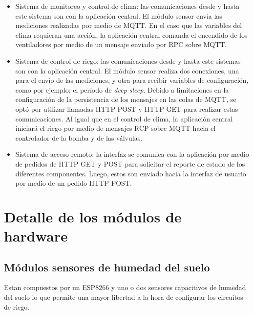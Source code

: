  \begin{itemize}
	\item Sistema de monitoreo y control de clima: las comunicaciones desde y hasta este sistema son con la aplicación central.
	El módulo sensor envía las mediciones realizadas por medio de MQTT.
	En el caso que las variables del clima requieran una acción, la aplicación central comanda el encendido de los ventiladores por medio de un mensaje enviado por RPC sobre MQTT.
	
	\item Sistema de control de riego: las comunicaciones desde y hasta este sistemas son con la aplicación central.
	El módulo sensor realiza dos conexiones, una para el envío de las mediciones, y otra para recibir variables de configuración, como por ejemplo: el período de \textit{deep sleep}. Debido a limitaciones en la configuración de la persistencia de los mensajes en las colas de MQTT, se optó por utilizar llamadas HTTP POST y HTTP GET para realizar estas comunicaciones.
	Al igual que en el control de clima, la aplicación central iniciará el riego por medio de mensajes RCP sobre MQTT hacia el controlador de la bomba y de las válvulas.
	
	\item Sistema de acceso remoto: la interfaz se comunica con la aplicación por medio de pedidos de HTTP GET y POST para solicitar el reporte de estado de los diferentes componentes. Luego, estos son enviado hacia la interfaz de usuario por medio de un pedido HTTP POST.
 
 
 
 
 \end{itemize}






\section{Detalle de los módulos de hardware}
\label{sec:Módulos de hardware}

\subsection{Módulos sensores de humedad del suelo}
\label{Módulos sensores de humedad del suelo}

Estan compuestos por un ESP8266 y uno o dos sensores capacitivos de humedad del suelo lo que permite una mayor libertad a la hora de configurar los circuitos de riego.

